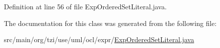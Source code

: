 Definition at line 56 of file Exp\-Ordered\-Set\-Literal.\-java.



The documentation for this class was generated from the following file\-:\begin{DoxyCompactItemize}
\item 
src/main/org/tzi/use/uml/ocl/expr/\hyperlink{_exp_ordered_set_literal_8java}{Exp\-Ordered\-Set\-Literal.\-java}\end{DoxyCompactItemize}
